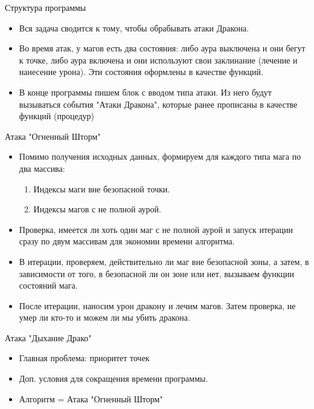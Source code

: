 \begin{frame}{Структура программы}
\begin{itemize}
    \item Вся задача сводится к тому, чтобы обрабывать атаки Дракона.
    \item Во время атак, у магов есть два состояния: либо аура выключена и они бегут к точке, либо аура включена и они используют свои заклинание (лечение и нанесение урона). Эти состояния оформлены в качестве функций.
    \item В конце программы пишем блок с вводом типа атаки. Из него будут вызываться события "Атаки Дракона", которые ранее прописаны в качестве функций (процедур)
\end{itemize}
\end{frame}

\begin{frame}{Атака "Огненный Шторм"}
\begin{itemize}
    \item Помимо получения исходных данных, формируем для каждого типа мага по два массива: \begin{enumerate}
        \item Индексы маги вне безопасной точки.
        \item Индексы магов с не полной аурой.
    \end{enumerate}
    \item Проверка, имеется ли хоть один маг с не полной аурой и запуск итерации сразу по двум массивам для экономии времени алгоритма.
    \item В итерации, проверяем, действительно ли маг вне безопасной зоны, а затем, в зависимости от того, в безопасной ли он зоне или нет, вызываем функции состояний мага.
    \item После итерации, наносим урон дракону и лечим магов. Затем проверка, не умер ли кто-то и можем ли мы убить дракона.

\end{itemize}
\end{frame}

\begin{frame}{Атака "Дыхание Драко"}
\begin{itemize}
    \item Главная проблема: приоритет точек
    \item Доп. условия для сокращения времени программы.
    \item Алгоритм = Атака "Огненный Шторм"

\end{itemize}
\end{frame}

